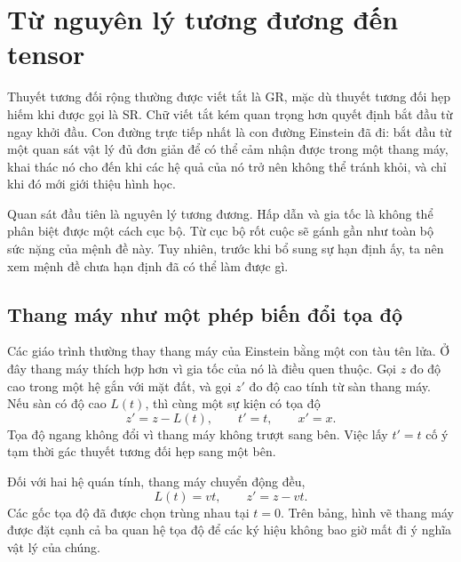 \chapter{Từ nguyên lý tương đương đến tensor}

Thuyết tương đối rộng thường được viết tắt là GR, mặc dù thuyết tương đối hẹp hiếm khi được gọi là SR. Chữ viết tắt kém quan trọng hơn quyết định bắt đầu từ ngay khởi đầu. Con đường trực tiếp nhất là con đường Einstein đã đi: bắt đầu từ một quan sát vật lý đủ đơn giản để có thể cảm nhận được trong một thang máy, khai thác nó cho đến khi các hệ quả của nó trở nên không thể tránh khỏi, và chỉ khi đó mới giới thiệu hình học.

Quan sát đầu tiên là nguyên lý tương đương. Hấp dẫn và gia tốc là không thể phân biệt được một cách cục bộ. Từ cục bộ rốt cuộc sẽ gánh gần như toàn bộ sức nặng của mệnh đề này. Tuy nhiên, trước khi bổ sung sự hạn định ấy, ta nên xem mệnh đề chưa hạn định đã có thể làm được gì.

\section{Thang máy như một phép biến đổi tọa độ}

Các giáo trình thường thay thang máy của Einstein bằng một con tàu tên lửa. Ở đây thang máy thích hợp hơn vì gia tốc của nó là điều quen thuộc. Gọi \(z\) đo độ cao trong một hệ gắn với mặt đất, và gọi \(z'\) đo độ cao tính từ sàn thang máy. Nếu sàn có độ cao \(L(t)\), thì cùng một sự kiện có tọa độ
\begin{equation}
 z'=z-L(t),\qquad t'=t,\qquad x'=x.
\label{eq:elevator-map}
\end{equation}
Tọa độ ngang không đổi vì thang máy không trượt sang bên. Việc lấy \(t'=t\) cố ý tạm thời gác thuyết tương đối hẹp sang một bên.

\begin{classroomqa}
\end{classroomqa}

Đối với hai hệ quán tính, thang máy chuyển động đều,
\begin{equation}
 L(t)=vt,\qquad z'=z-vt.
\label{eq:galilean-elevator}
\end{equation}
Các gốc tọa độ đã được chọn trùng nhau tại \(t=0\). Trên bảng, hình vẽ thang máy được đặt cạnh cả ba quan hệ tọa độ để các ký hiệu không bao giờ mất đi ý nghĩa vật lý của chúng.

